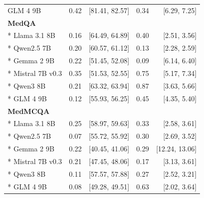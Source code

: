 \begin{longtable}{lrrrr}
GLM 4 9B & 0.42 & [81.41, 82.57] & 0.34 & [6.29, 7.25]\\
\multicolumn{5}{l}{\textbf{MedQA}}\\*
Llama 3.1 8B & 0.16 & [64.49, 64.89] & 0.40 & [2.51, 3.56]\\*
Qwen2.5 7B & 0.20 & [60.57, 61.12] & 0.13 & [2.28, 2.59]\\*
Gemma 2 9B & 0.22 & [51.45, 52.08] & 0.09 & [6.14, 6.40]\\*
Mistral 7B v0.3 & 0.35 & [51.53, 52.55] & 0.75 & [5.17, 7.34]\\*
Qwen3 8B & 0.21 & [63.32, 63.94] & 0.87 & [3.63, 5.66]\\*
GLM 4 9B & 0.12 & [55.93, 56.25] & 0.45 & [4.35, 5.40]\\
\multicolumn{5}{l}{\textbf{MedMCQA}}\\*
Llama 3.1 8B & 0.25 & [58.97, 59.63] & 0.33 & [2.58, 3.61]\\*
Qwen2.5 7B & 0.07 & [55.72, 55.92] & 0.30 & [2.69, 3.52]\\*
Gemma 2 9B & 0.22 & [40.45, 41.06] & 0.29 & [12.24, 13.06]\\*
Mistral 7B v0.3 & 0.21 & [47.45, 48.06] & 0.17 & [3.13, 3.61]\\*
Qwen3 8B & 0.11 & [57.57, 57.88] & 0.27 & [2.52, 3.21]\\*
GLM 4 9B & 0.08 & [49.28, 49.51] & 0.63 & [2.02, 3.64]\\
\end{longtable}\endgroup
